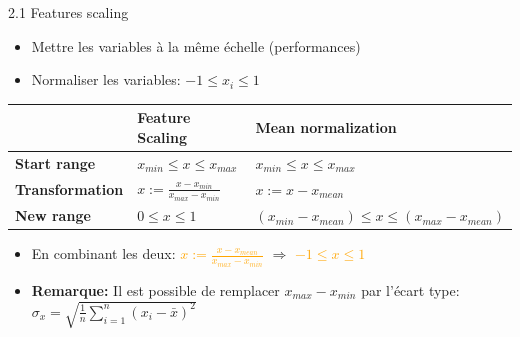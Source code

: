 \begin{frame}{2.1 Features scaling}
  \begin{itemize}
  \item Mettre les variables à la même échelle (performances)
  \item Normaliser les variables: $-1 \leq x_{i} \leq 1$
  \end{itemize}
  \vspace{-0.2cm}
  \begin{table}
    \footnotesize
        {\def\arraystretch{2}\tabcolsep=8pt
          \begin{tabular}{l|l|l}
            & \textbf{Feature Scaling} & \textbf{Mean normalization}\\
            \hline
            \textbf{Start range} & $x_{min} \leq x \leq x_{max}$ & $x_{min} \leq x \leq x_{max}$ \\
            \textbf{Transformation} & $x := \frac{x - x_{min}}{x_{max} - x_{min}}$ & $x := x - x_{mean}$ \\
            \textbf{New range} & $0 \leq x \leq 1$ & $(x_{min}-x_{mean}) \leq x \leq (x_{max}-x_{mean})$
          \end{tabular}
        }
  \end{table}
  \vspace{-0.2cm}
  \begin{itemize}
  \item En combinant les deux: \boldmath \textcolor{orange}{$x := \frac{x - x_{mean}}{x_{max} - x_{min}}$} $\Rightarrow$ \textcolor{orange}{$-1 \leq x \leq 1$} 
    \vspace{0.2cm}
    \footnotesize
  \item\textbf{Remarque:} Il est possible de remplacer $x_{max} - x_{min}$ par l'écart type: $\sigma_{x} = \sqrt{\frac{1}{n}\displaystyle\sum_{i=1}^{n}(x_{i} - \bar{x})^{2}}$
  \end{itemize}
\end{frame}

